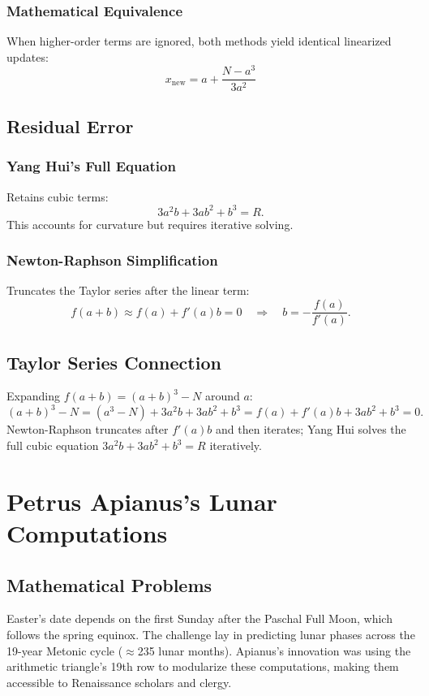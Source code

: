 \documentclass{article}
\begin{document}
\subsubsection{Mathematical Equivalence}
When higher-order terms are ignored, both methods yield identical linearized updates:
\[
\boxed{x_{\text{new}} = a + \frac{N - a^3}{3a^2}}
\]

\subsection{Residual Error}
\subsubsection{Yang Hui's Full Equation}
Retains cubic terms:
\[
3a^2b + 3ab^2 + b^3 = R.
\]
This accounts for curvature but requires iterative solving.

\subsubsection{Newton-Raphson Simplification}
Truncates the Taylor series after the linear term:
\[
f(a + b) \approx f(a) + f'(a)b = 0 \quad \Rightarrow \quad b = -\frac{f(a)}{f'(a)}.
\]

\subsection{Taylor Series Connection}
Expanding \(f(a + b) = (a + b)^3 - N\) around \(a\):
\[
(a + b)^3 - N = (a^3 - N) + 3a^2b + 3ab^2 + b^3 = f(a)+f'(a)b+3ab^2+b^3=0.
\]
Newton-Raphson truncates after \(f'(a)b\) and then iterates; Yang Hui solves the full cubic equation \(3a^2b+3ab^2+b^3=R\) iteratively.


\section{Petrus Apianus’s Lunar Computations}

\subsection{Mathematical Problems}

 Easter’s date depends on the first Sunday after the Paschal Full Moon, which follows the spring equinox.\citep{apianus1527} The challenge lay in predicting lunar phases across the 19-year Metonic cycle ($\approx$235 lunar months). Apianus’s innovation was using the arithmetic triangle’s 19th row to modularize these computations, making them accessible to Renaissance scholars and clergy. \citep{boyer1950}
\end{document}
